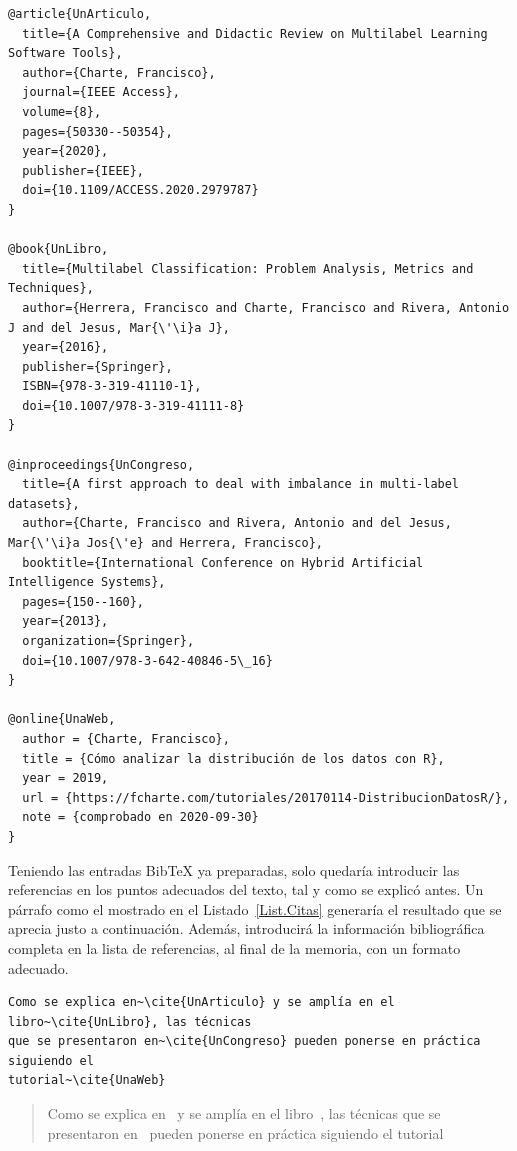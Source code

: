 \begin{lstlisting}[caption={Entradas BibTex de distintos tipos},label=List.BibTeX,language={[LaTeX]TeX}]
@article{UnArticulo,
  title={A Comprehensive and Didactic Review on Multilabel Learning Software Tools},
  author={Charte, Francisco},
  journal={IEEE Access},
  volume={8},
  pages={50330--50354},
  year={2020},
  publisher={IEEE},
  doi={10.1109/ACCESS.2020.2979787}
}

@book{UnLibro,
  title={Multilabel Classification: Problem Analysis, Metrics and Techniques},
  author={Herrera, Francisco and Charte, Francisco and Rivera, Antonio J and del Jesus, Mar{\'\i}a J},
  year={2016},
  publisher={Springer},
  ISBN={978-3-319-41110-1},
  doi={10.1007/978-3-319-41111-8}
}

@inproceedings{UnCongreso,
  title={A first approach to deal with imbalance in multi-label datasets},
  author={Charte, Francisco and Rivera, Antonio and del Jesus, Mar{\'\i}a Jos{\'e} and Herrera, Francisco},
  booktitle={International Conference on Hybrid Artificial Intelligence Systems},
  pages={150--160},
  year={2013},
  organization={Springer},
  doi={10.1007/978-3-642-40846-5\_16}
}

@online{UnaWeb,
  author = {Charte, Francisco},
  title = {Cómo analizar la distribución de los datos con R},
  year = 2019,
  url = {https://fcharte.com/tutoriales/20170114-DistribucionDatosR/}, 
  note = {comprobado en 2020-09-30}
}
\end{lstlisting}

Teniendo las entradas BibTeX ya preparadas, solo quedaría introducir las referencias en los puntos adecuados del texto, tal y como se explicó antes. Un párrafo como el mostrado en el Listado~\ref{List.Citas} generaría el resultado que se aprecia justo a continuación. Además, introducirá la información bibliográfica completa en la lista de referencias, al final de la memoria, con un formato adecuado.

\begin{lstlisting}[caption={Párrafo en el que se citan varios trabajos},language={[LaTeX]TeX},label=List.Citas]
Como se explica en~\cite{UnArticulo} y se amplía en el libro~\cite{UnLibro}, las técnicas 
que se presentaron en~\cite{UnCongreso} pueden ponerse en práctica siguiendo el 
tutorial~\cite{UnaWeb}
\end{lstlisting}

\begin{quotation}
Como se explica en~\cite{UnArticulo} y se amplía en el libro~\cite{UnLibro}, las técnicas que se presentaron en~\cite{UnCongreso} pueden ponerse en práctica siguiendo el tutorial~\cite{UnaWeb}
\end{quotation}

